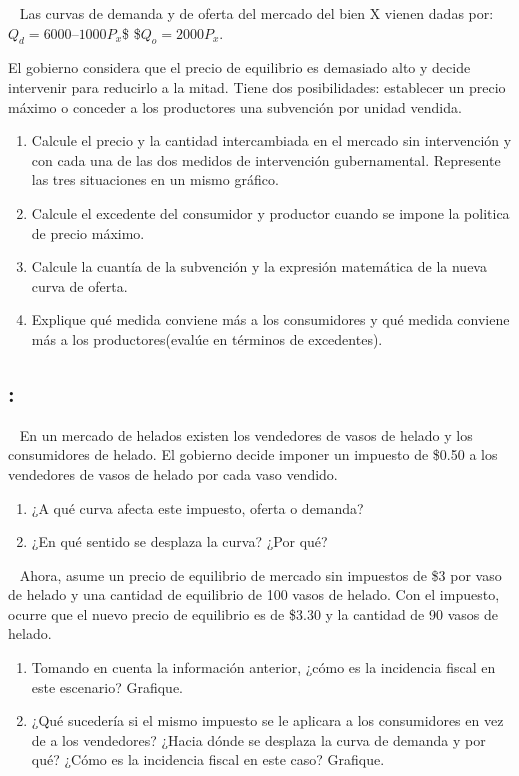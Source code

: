 \documentclass[
  letterpaper,
  DIV=11,
  numbers=noendperiod]{scrreport}
\begin{document}
~ Las curvas de demanda y de oferta del mercado del bien X vienen dadas
por: \(Q_d = 6000–1000P_x\)\$ \$\(Q_o = 2000P_x\).

El gobierno considera que el precio de equilibrio es demasiado alto y
decide intervenir para reducirlo a la mitad. Tiene dos posibilidades:
establecer un precio máximo o conceder a los productores una subvención
por unidad vendida.

\begin{enumerate}
\def\labelenumi{\alph{enumi})}
\item
  Calcule el precio y la cantidad intercambiada en el mercado sin
  intervención y con cada una de las dos medidos de intervención
  gubernamental. Represente las tres situaciones en un mismo gráfico.
\item
  Calcule el excedente del consumidor y productor cuando se impone la
  politica de precio máximo.
\item
  Calcule la cuantía de la subvención y la expresión matemática de la
  nueva curva de oferta.
\item
  Explique qué medida conviene más a los consumidores y qué medida
  conviene más a los productores(evalúe en términos de excedentes).
\end{enumerate}

\hypertarget{section-56}{%
\subsection{:}\label{section-56}}

~ En un mercado de helados existen los vendedores de vasos de helado y
los consumidores de helado. El gobierno decide imponer un impuesto de
\$0.50 a los vendedores de vasos de helado por cada vaso vendido.

\begin{enumerate}
\def\labelenumi{\alph{enumi})}
\item
  ¿A qué curva afecta este impuesto, oferta o demanda?
\item
  ¿En qué sentido se desplaza la curva? ¿Por qué?
\end{enumerate}

~ Ahora, asume un precio de equilibrio de mercado sin impuestos de \$3
por vaso de helado y una cantidad de equilibrio de 100 vasos de helado.
Con el impuesto, ocurre que el nuevo precio de equilibrio es de \$3.30 y
la cantidad de 90 vasos de helado.

\begin{enumerate}
\def\labelenumi{\alph{enumi})}
\setcounter{enumi}{2}
\item
  Tomando en cuenta la información anterior, ¿cómo es la incidencia
  fiscal en este escenario? Grafique.
\item
  ¿Qué sucedería si el mismo impuesto se le aplicara a los consumidores
  en vez de a los vendedores? ¿Hacia dónde se desplaza la curva de
  demanda y por qué? ¿Cómo es la incidencia fiscal en este caso?
  Grafique.
\end{enumerate}
\end{document}
